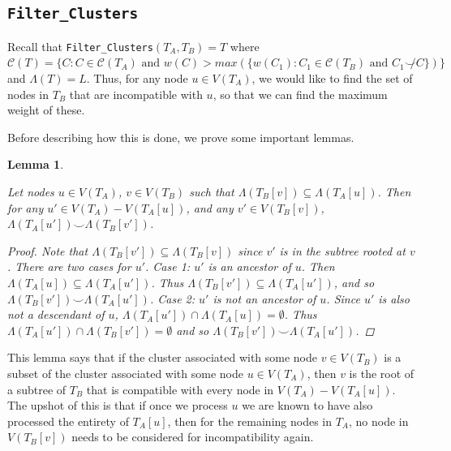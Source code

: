 \documentclass{article}
\newcommand{\compatible}{\smile}
\newcommand{\leafset}{\Lambda}
\newtheorem{filterclusterssubsetcompatible}[incompatibility]{Lemma}
\begin{document}
    \subsection{\texttt{Filter\_Clusters}}
    \label{subsec:filterclusters}

    Recall that \texttt{Filter\_Clusters}$(T_A, T_B) = T$ where $\mathcal{C}(T) = \{C : C \in \mathcal{C}(T_A) \text{ and } w(C) > max(\{w(C_1) : C_1 \in \mathcal{C}(T_B) \text{ and } C_1 \not\compatible C\})\}$ and $\leafset(T) = L$. Thus, for any node $u \in V(T_A)$, we would like to find the set of nodes in $T_B$ that are incompatible with $u$, so that we can find the maximum weight of these.

    Before describing how this is done, we prove some important lemmas.
    \newline

    \begin{filterclusterssubsetcompatible}
        \label{lem:filterclusterssubsetcompatible}

        Let nodes $u \in V(T_A)$, $v \in V(T_B)$ such that $\leafset(T_B[v]) \subseteq \leafset(T_A[u])$. Then for any $u' \in V(T_A) - V(T_A[u])$, and any $v' \in V(T_B[v])$, $\leafset(T_A[u']) \compatible \leafset(T_B[v'])$.

        \begin{proof}
            Note that $\leafset(T_B[v']) \subseteq \leafset(T_B[v])$ since $v'$ is in the subtree rooted at $v$. There are two cases for $u'$. \textit{Case 1}: $u'$ is an ancestor of $u$. Then $\leafset(T_A[u]) \subseteq \leafset(T_A[u'])$. Thus $\leafset(T_B[v']) \subseteq \leafset(T_A[u'])$, and so $\leafset(T_B[v']) \compatible \leafset(T_A[u'])$. \textit{Case 2}: $u'$ is not an ancestor of $u$. Since $u'$ is also not a descendant of $u$, $\leafset(T_A[u']) \cap \leafset(T_A[u]) = \emptyset$. Thus $\leafset(T_A[u']) \cap \leafset(T_B[v']) = \emptyset$ and so $\leafset(T_B[v']) \compatible \leafset(T_A[u'])$.
        \end{proof}
    \end{filterclusterssubsetcompatible}

    This lemma says that if the cluster associated with some node $v \in V(T_B)$ is a subset of the cluster associated with some node $u \in V(T_A)$, then $v$ is the root of a subtree of $T_B$ that is compatible with every node in $V(T_A) - V(T_A[u])$. The upshot of this is that if once we process $u$ we are known to have also processed the entirety of $T_A[u]$, then for the remaining nodes in $T_A$, no node in $V(T_B[v])$ needs to be considered for incompatibility again.
\end{document}

